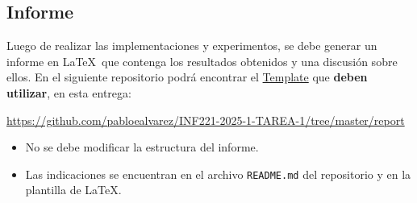 \subsection{Informe}

Luego de realizar las implementaciones y experimentos, se debe generar un informe en \LaTeX\ que contenga los resultados obtenidos y una discusión sobre ellos. En el siguiente repositorio podrá encontrar el \href{https://github.com/pabloealvarez/INF221-2025-1-TAREA-1/tree/master/report}{Template} que \textbf{deben utilizar}, en esta entrega:

\begin{mdframed}

\begin{center}
    
    \url{https://github.com/pabloealvarez/INF221-2025-1-TAREA-1/tree/master/report}
        
\end{center}
\end{mdframed}

\begin{itemize}
    \item No se debe modificar la estructura del informe.
    \item Las indicaciones se encuentran en el archivo \texttt{README.md} del repositorio y en la plantilla de \LaTeX. 
\end{itemize}

